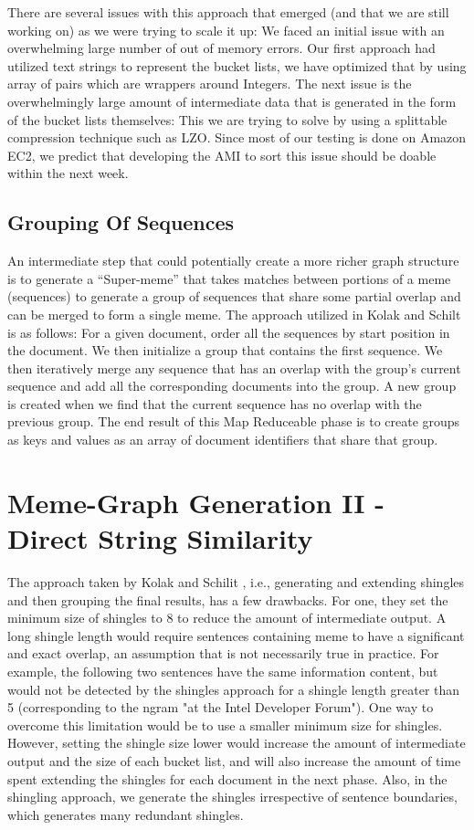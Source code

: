 \documentclass{acm_proc_article-sp}
\begin{document}
 There are several issues with this approach that emerged (and that we are still working on) as we were trying to scale it up: We faced an initial issue with an overwhelming large number of out of memory errors. Our first approach had utilized text strings to represent the bucket lists, we have optimized that by using array of pairs which are wrappers around Integers. The next issue is the overwhelmingly large amount of intermediate data that is generated in the form of the bucket lists themselves: This we are trying to solve by using a splittable compression technique such as LZO. Since most of our testing is done on Amazon EC2, we predict that developing the AMI to sort this issue should be doable within the next week. 
 
 \subsection{Grouping Of Sequences}
 An intermediate step that could potentially create a more richer graph structure is to generate a ``Super-meme'' that takes matches between portions of a meme (sequences) to generate a group of sequences that share some partial overlap and can be merged to form a single meme. The approach utilized in Kolak and Schilt \cite{kolak2008generating} is as follows: For a given document, order all the sequences by start position in the document. We then initialize a group that contains the first sequence. We then iteratively merge any sequence that has an overlap with the group's current sequence and add all the corresponding documents into the group. A new group is created when we find that the current sequence has no overlap with the previous group. The end result of this Map Reduceable phase is to create groups as keys and values as an array of document identifiers that share that group. 
 
\section{Meme-Graph Generation II - Direct String Similarity}
The approach taken by Kolak and Schilit  \cite{kolak2008generating} , i.e., generating and extending shingles and then grouping the final results, has a few drawbacks. For one, they set the minimum size of shingles to 8 to reduce the amount of intermediate output. A long shingle length would require sentences containing meme to have a significant and exact overlap, an assumption that is not necessarily true in practice. For example, the following two sentences have the same information content, but would not be detected by the shingles approach for a shingle length greater than 5 (corresponding to the ngram "at the Intel Developer Forum"). One way to overcome this limitation would be to use a smaller minimum size for shingles. However, setting the shingle size lower would increase the amount of intermediate output and the size of each bucket list, and will also increase the amount of time spent extending the shingles for each document in the next phase. Also, in the shingling approach, we generate the shingles irrespective of sentence boundaries, which generates many redundant shingles.
\end{document}
